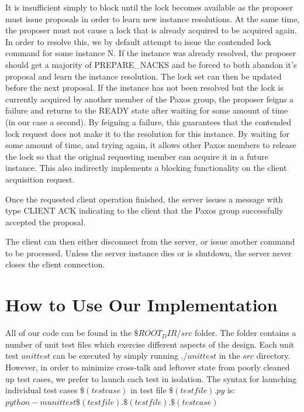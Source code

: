 \documentclass{article}
\begin{document}
It is insufficient simply to block until the lock becomes available as the proposer must issue proposals in order to learn new instance resolutions.
At the same time, the proposer must not cause a lock that is already acquired to be acquired again.
In order to resolve this, we by default attempt to issue the contended lock command for some instance N.
If the instance was already resolved, the proposer should get a majority of PREPARE\_NACKS and be forced to both abandon it's proposal and learn the instance resolution.
The lock set can then be updated before the next proposal.
If the instance has not been resolved but the lock is currently acquired by another member of the Paxos group, the proposer feigns a failure and returns to the READY state after waiting for some amount of time (in our case a second).
By feigning a failure, this guarantees that the contended lock request does not make it to the resolution for this instance.
By waiting for some amount of time, and trying again, it allows other Paxos members to release the lock so that the original requesting member can acquire it in a future instance.
This also indirectly implements a blocking functionality on the client acquisition request.

Once the requested client operation finished, the server issues a message with type CLIENT ACK indicating to the client that the Paxos group successfully accepted the proposal.

The client can then either disconnect from the server, or issue another command to be processed.
Unless the server instance dies or is shutdown, the server never closes the client connection.



\section{How to Use Our Implementation}

All of our code can be found in the $\${ROOT_DIR}/src$ folder.
The folder contains a number of unit test files which exercise different aspects of the design.
Each unit test $unittest$ can be executed by simply running $./unittest$ in the $src$ directory.
However, in order to minimize cross-talk and leftover state from poorly cleaned up test cases, we prefer to launch each test in isolation.
The syntax for launching individual test cases $\$(testcase)$ in test file $\$(testfile).py$ is:
$ python -m unittest \$(testfile).\$(testfile).\$(testcase) $
\end{document}

